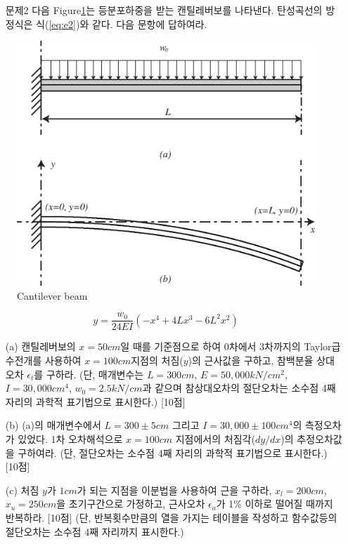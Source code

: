 \documentclass[a4,10pt]{article}
\theoremstyle{examplestyle}
\begin{document}
\begin{itemize}
\item[문제2] 다음 Figure\ref{fig:e2}는 등분포하중을 받는 캔틸레버보를 나타낸다. 탄성곡선의 방정식은 식(\ref{eq:e2})와 같다. 다음 문항에 답하여라.
\end{itemize}
\begin{figure}[!hbpt]
\centering
\includegraphics[keepaspectratio=true,width=0.6\linewidth]{midterm/2.eps}
\caption{Cantilever beam}
\label{fig:e2}
\end{figure}

\begin{equation}\label{eq:e2}
y=\frac{w_{0}}{24EI}\left(-x^4+4Lx^3-6L^2 x^2\right)
\end{equation}
\begin{itemize}
\item[(a)] 캔틸레버보의 $x=50cm$일 때를 기준점으로 하여 0차에서 3차까지의 Taylor급수전개를 사용하여 $x=100cm$지점의 처짐($y$)의 근사값을 구하고, 참백분율 상대오차 $\epsilon_{t}$를 구하라. (단, 매개변수는 $L=300cm$, $E=50,000kN/cm^2$, $I=30,000cm^4$, $w_{0}=2.5kN/cm$과 같으며 참상대오차의 절단오차는 소수점 4째 자리의 과학적 표기법으로 표시한다.) [10점]
\item[(b)] (a)의 매개변수에서 $L=300\pm5cm$ 그리고 $I=30,000\pm100cm^4$의 측정오차가 있었다. 1차 오차해석으로 $x=100cm$ 지점에서의 처짐각($dy/dx$)의 추정오차값을 구하여라. (단, 절단오차는 소수점 4째 자리의 과학적 표기법으로 표시한다.) [10점]
\item[(c)] 처짐 $y$가 $1cm$가 되는 지점을 이분법을 사용하여 근을 구하라, $x_{l}=200cm$, $x_{u}=250cm$을 초기구간으로 가정하고, 근사오차 $\epsilon_{a}$가 1\% 이하로 떨어질 때까지 반복하라. [10점] (단, 반복횟수만큼의 열을 가지는 테이블을 작성하고 함수값등의 절단오차는 소수점 4째 자리까지 표시한다.)
\end{itemize}
\end{document}
